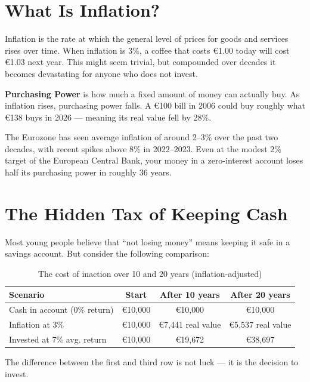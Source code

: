 \documentclass[12pt, a4paper]{book}
\begin{document}
\section{What Is Inflation?}

Inflation is the rate at which the general level of prices for goods and services rises over time. When inflation is 3\%, a coffee that costs \euro{}1.00 today will cost \euro{}1.03 next year. This might seem trivial, but compounded over decades it becomes devastating for anyone who does not invest.

\begin{keybox}
\textbf{Purchasing Power} is how much a fixed amount of money can actually buy. As inflation rises, purchasing power falls. A \euro{}100 bill in 2006 could buy roughly what \euro{}138 buys in 2026 --- meaning its real value fell by 28\%.
\end{keybox}

The Eurozone has seen average inflation of around 2--3\% over the past two decades, with recent spikes above 8\% in 2022--2023. Even at the modest 2\% target of the European Central Bank, your money in a zero-interest account loses half its purchasing power in roughly 36 years.

\section{The Hidden Tax of Keeping Cash}

Most young people believe that ``not losing money'' means keeping it safe in a savings account. But consider the following comparison:

\begin{table}[h!]
\centering
\begin{tabular}{lccc}
\toprule
\textbf{Scenario} & \textbf{Start} & \textbf{After 10 years} & \textbf{After 20 years} \\
\midrule
Cash in account (0\% return) & \euro{}10{,}000 & \euro{}10{,}000 & \euro{}10{,}000 \\
Inflation at 3\% & \euro{}10{,}000 & \euro{}7{,}441 real value & \euro{}5{,}537 real value \\
Invested at 7\% avg. return & \euro{}10{,}000 & \euro{}19{,}672 & \euro{}38{,}697 \\
\bottomrule
\end{tabular}
\caption{The cost of inaction over 10 and 20 years (inflation-adjusted)}
\end{table}

The difference between the first and third row is not luck --- it is the decision to invest.
\end{document}

